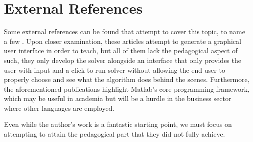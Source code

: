 \section{External References}
Some external references can be found that attempt to cover this topic, to name a few \cite{BUldingMatlabGUI,vonDohlen2020,Kosasih,kosasih2007incorporating,welfert1996applied}. Upon closer examination, these articles attempt to generate a graphical user interface in order to teach, but all of them lack the pedagogical aspect of such, they only develop the solver alongside an interface that only provides the user with input and a click-to-run solver without allowing the end-user to properly choose and see what the algorithm does behind the scenes. Furthermore, the aforementioned publications highlight Matlab's core programming framework, which may be useful in academia but will be a hurdle in the business sector where other languages are employed.


Even while the author's work is a fantastic starting point, we must focus on attempting to attain the pedagogical part that they did not fully achieve.